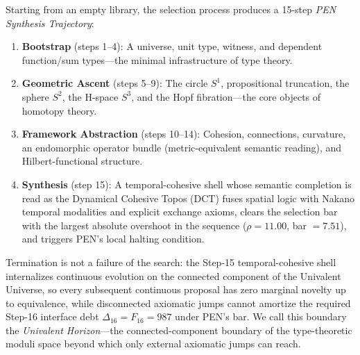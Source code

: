 \documentclass[11pt,a4paper]{article}
\theoremstyle{plain}
\theoremstyle{definition}
\theoremstyle{remark}
\begin{document}
Starting from an empty library, the selection process produces a 15-step \emph{PEN Synthesis Trajectory}:
\begin{enumerate}[nosep]
    \item \textbf{Bootstrap} (steps 1--4): A universe, unit type, witness, and dependent function/sum types---the minimal infrastructure of type theory.
    \item \textbf{Geometric Ascent} (steps 5--9): The circle $S^1$, propositional truncation, the sphere $S^2$, the H-space $S^3$, and the Hopf fibration---the core objects of homotopy theory.
    \item \textbf{Framework Abstraction} (steps 10--14): Cohesion, connections, curvature, an endomorphic operator bundle (metric-equivalent semantic reading), and Hilbert-functional structure.
    \item \textbf{Synthesis} (step 15): A temporal-cohesive shell whose semantic completion is read as the Dynamical Cohesive Topos (DCT) fuses spatial logic with Nakano temporal modalities and explicit exchange axioms, clears the selection bar with the largest absolute overshoot in the sequence ($\rho = 11.00$, bar $= 7.51$), and triggers PEN's local halting condition.
\end{enumerate}
Termination is not a failure of the search: the Step-15 temporal-cohesive shell internalizes continuous evolution on the connected component of the Univalent Universe, so every subsequent continuous proposal has zero marginal novelty up to equivalence, while disconnected axiomatic jumps cannot amortize the required Step-16 interface debt $\Delta_{16}=F_{16}=987$ under PEN's bar.
We call this boundary the \emph{Univalent Horizon}---the connected-component boundary of the type-theoretic moduli space beyond which only external axiomatic jumps can reach.
\end{document}
